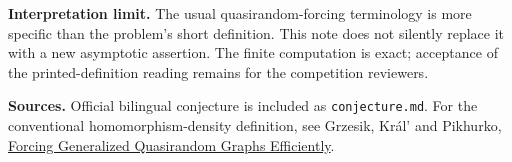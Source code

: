\documentclass[11pt]{article}
\begin{document}
\textbf{Interpretation limit.} The usual quasirandom-forcing terminology is
more specific than the problem's short definition. This note does not silently
replace it with a new asymptotic assertion. The finite computation is exact;
acceptance of the printed-definition reading remains for the competition reviewers.

\textbf{Sources.} Official bilingual conjecture is included as
\texttt{conjecture.md}. For the conventional homomorphism-density definition,
see Grzesik, Kr\'al' and Pikhurko,
\href{https://arxiv.org/abs/2303.04041}{Forcing Generalized Quasirandom Graphs Efficiently}.
\end{document}
